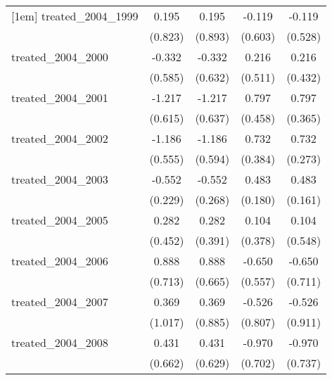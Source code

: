 {\begin{tabular}{l*{4}{c}}
[1em]
treated\_2004\_1999&       0.195         &       0.195         &      -0.119         &      -0.119         \\
            &     (0.823)         &     (0.893)         &     (0.603)         &     (0.528)         \\
[1em]
treated\_2004\_2000&      -0.332         &      -0.332         &       0.216         &       0.216         \\
            &     (0.585)         &     (0.632)         &     (0.511)         &     (0.432)         \\
[1em]
treated\_2004\_2001&      -1.217\sym{*}  &      -1.217         &       0.797         &       0.797\sym{*}  \\
            &     (0.615)         &     (0.637)         &     (0.458)         &     (0.365)         \\
[1em]
treated\_2004\_2002&      -1.186\sym{*}  &      -1.186\sym{*}  &       0.732         &       0.732\sym{**} \\
            &     (0.555)         &     (0.594)         &     (0.384)         &     (0.273)         \\
[1em]
treated\_2004\_2003&      -0.552\sym{*}  &      -0.552\sym{*}  &       0.483\sym{**} &       0.483\sym{**} \\
            &     (0.229)         &     (0.268)         &     (0.180)         &     (0.161)         \\
[1em]
treated\_2004\_2005&       0.282         &       0.282         &       0.104         &       0.104         \\
            &     (0.452)         &     (0.391)         &     (0.378)         &     (0.548)         \\
[1em]
treated\_2004\_2006&       0.888         &       0.888         &      -0.650         &      -0.650         \\
            &     (0.713)         &     (0.665)         &     (0.557)         &     (0.711)         \\
[1em]
treated\_2004\_2007&       0.369         &       0.369         &      -0.526         &      -0.526         \\
            &     (1.017)         &     (0.885)         &     (0.807)         &     (0.911)         \\
[1em]
treated\_2004\_2008&       0.431         &       0.431         &      -0.970         &      -0.970         \\
            &     (0.662)         &     (0.629)         &     (0.702)         &     (0.737)         \\

\end{tabular}}
